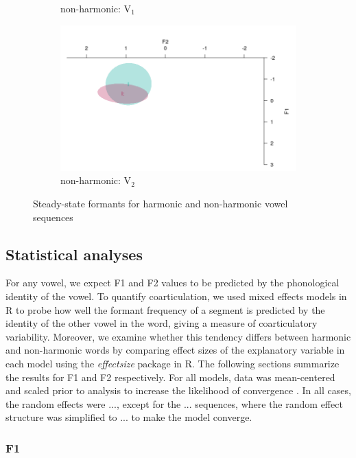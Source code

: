 \documentclass[a4paper,11pt,twocolumn]{article}
\begin{document}
\begin{center}
\begin{figure}[!ht]
\begin{subfigure}[t]{0.2\textwidth}
				\caption{non-harmonic: V$_1$} \label{nh_v1}
			\end{subfigure}
			\begin{subfigure}[t]{0.2\textwidth}
				\centering
				\includegraphics[scale=0.2]{nh_v2.png} 
				\caption{non-harmonic: V$_2$} \label{nh_v2}
			\end{subfigure}
			\caption{Steady-state formants for harmonic and non-harmonic vowel sequences}
			\label{figure_combined}
		\end{figure}
	\end{center}
	\FloatBarrier
	
	\subsection{Statistical analyses}
	For any vowel, we expect F1 and F2 values to be predicted by the phonological identity of the vowel. To quantify coarticulation, we used mixed effects models \cite{lme4} in R \cite{R-Core-Team:2015aa} to probe how well the formant frequency of a segment is predicted by the identity of the other vowel in the word, giving a measure of coarticulatory variability. Moreover, we examine whether this tendency differs between harmonic and non-harmonic words by comparing effect sizes of the explanatory variable in each model using the \textit{effectsize}  package \cite{effectsize} in R. The following sections summarize the results for F1 and F2 respectively. For all models, data was mean-centered and scaled prior to analysis to increase the likelihood of convergence \cite{bates2015}. In all cases, the random effects were ..., except for the ... sequences, where the random effect structure was simplified to ... to make the model converge.
	
	\subsubsection{F1}
	
\end{document}
